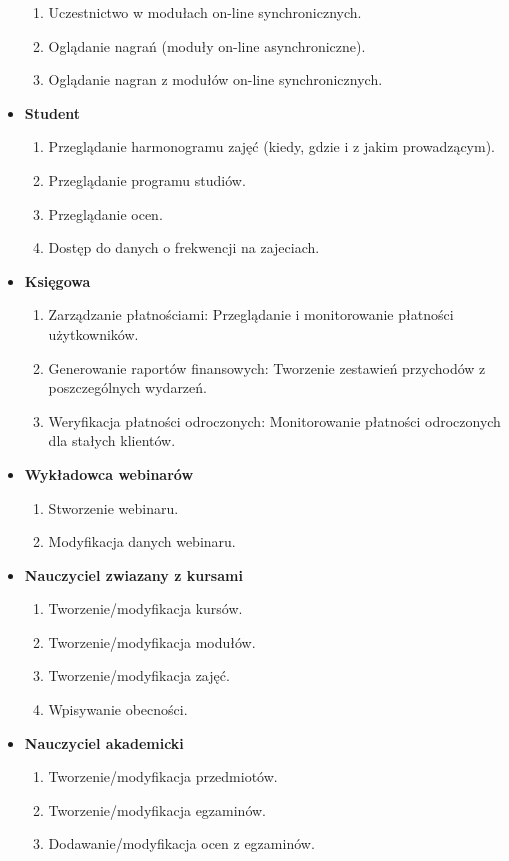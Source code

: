 \documentclass[11pt]{article}
\begin{document}
\begin{itemize}
\begin{enumerate}
\item Uczestnictwo w modułach on-line synchronicznych.
\item Oglądanie nagrań (moduły on-line asynchroniczne).
\item Oglądanie nagran z modułów on-line synchronicznych.
\end{enumerate}
\item \textbf{Student}
\begin{enumerate}
\item Przeglądanie harmonogramu zajęć (kiedy, gdzie i z jakim prowadzącym).
\item Przeglądanie programu studiów.
\item Przeglądanie ocen.
\item Dostęp do danych o frekwencji na zajeciach.
\end{enumerate}
\item \textbf{Księgowa}
\begin{enumerate}
\item Zarządzanie płatnościami: Przeglądanie i monitorowanie płatności użytkowników.
\item Generowanie raportów finansowych: Tworzenie zestawień przychodów z poszczególnych wydarzeń.
\item Weryfikacja płatności odroczonych: Monitorowanie płatności odroczonych dla stałych klientów.
\end{enumerate}
\item \textbf{Wykładowca webinarów}
\begin{enumerate}
\item Stworzenie webinaru.
\item Modyfikacja danych webinaru.
\end{enumerate}
\item \textbf{Nauczyciel zwiazany z kursami}
\begin{enumerate}
\item Tworzenie/modyfikacja kursów.
\item Tworzenie/modyfikacja modułów.
\item Tworzenie/modyfikacja zajęć.
\item Wpisywanie obecności.
\end{enumerate}
\item \textbf{Nauczyciel akademicki}
\begin{enumerate}
\item Tworzenie/modyfikacja przedmiotów.
\item Tworzenie/modyfikacja egzaminów.
\item Dodawanie/modyfikacja ocen z egzaminów.

\end{enumerate}
\end{itemize}
\end{document}
